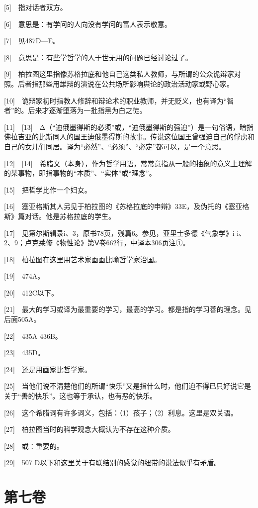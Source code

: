 \documentclass[12pt,oneside]{book}
\begin{document}
[5]　指对话者双方。

[6]　意思是：有学问的人向没有学问的富人表示敬意。

[7]　见487D—E。

[8]　意思是：有些学哲学的人于世无用的问题已经讨论过了。

[9]　柏拉图这里指像苏格拉底和他自己这类私人教师，与所谓的公众诡辩家对照。后者指那些用雄辩的演说在公共场所影响舆论的政治活动家或野心家。

[10]　诡辩家初时指教人修辞和辩论术的职业教师，并无贬义，也有译为“智者”的。后来才逐渐堕落为一批指黑为白之徒。

[11]　[13]　Δ（“迪俄墨得斯的必须”或，“迪俄墨得斯的强迫”）是一句俗语，暗指佛拉吉亚的比斯同人的国王迪俄墨得斯的故事。传说这位国王曾强迫自己的俘虏和自己的女儿们同居。译为“必然”、“必须”、“必定”都可以，是一个意思。

[12]　[14]　希腊文（本身），作为哲学用语，常常意指从一般的抽象的意义上理解的某事物，即指事物的“本质”、“实体”或“理念”。

[15]　把哲学比作一个妇女。

[16]　塞亚格斯其人另见于柏拉图的《苏格拉底的申辩》33E，及伪托的《塞亚格斯》篇对话。他是苏格拉底的学生。

[17]　见第尔斯辑录i、3，原书78页，残篇6。参见，亚里士多德《气象学》i i、2、9；卢克莱修《物性论》第Ⅴ卷662行，中译本306页注①。

[18]　柏拉图在这里用艺术家画画比喻哲学家治国。

[19]　474A。

[20]　412C以下。

[21]　最大的学习或译为最重要的学习，最高的学习。都是指的学习善的理念。见后面505A。

[22]　435A 436B。

[23]　435D。

[24]　还是用画家比哲学家。

[25]　当他们说不清楚他们的所谓“快乐”又是指什么时，他们迫不得已只好说它是关于“善的快乐”。这也等于承认，也有恶的快乐。

[26]　这个希腊词有许多词义，包括：（1）孩子；（2）利息。这里是双关语。

[27]　柏拉图当时的科学观念大概认为不存在这种介质。

[28]　或：重要的。

[29]　507 D以下和这里关于有联结别的感觉的纽带的说法似乎有矛盾。





\chapter{第七卷}
\end{document}
